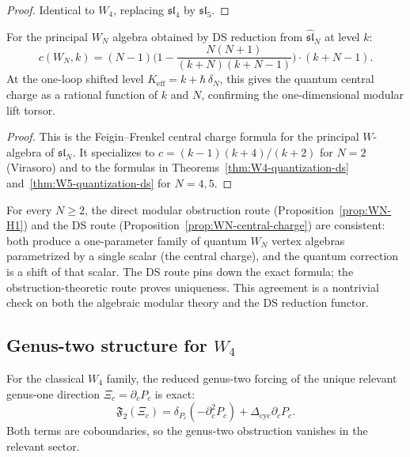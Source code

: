 \begin{proof}
Identical to $W_4$, replacing $\mathfrak{sl}_4$ by $\mathfrak{sl}_5$.
\end{proof}

\begin{proposition}
For the principal $W_N$ algebra obtained by DS reduction from
$\widehat{\mathfrak{sl}}_N$ at level $k$:
\begin{equation}%
c(W_N, k)
=
(N-1)\biggl(1 - \frac{N(N+1)}{(k+N)(k+N-1)}\biggr)
\cdot (k+N-1).
\end{equation}
At the one-loop shifted level $K_{\mathrm{eff}} = k + \hbar\,\delta_N$,
this gives the quantum central charge as a rational function of $k$
and $N$, confirming the one-dimensional modular lift torsor.
\end{proposition}

\begin{proof}
This is the Feigin--Frenkel central charge formula for the principal
$W$-algebra of $\mathfrak{sl}_N$. It specializes to $c = (k-1)(k+4)/(k+2)$
for $N=2$ (Virasoro) and to the formulas in
Theorems~\ref{thm:W4-quantization-ds} and~\ref{thm:W5-quantization-ds}
for $N=4,5$.
\end{proof}

\begin{remark}
For every $N \ge 2$, the direct modular obstruction route
(Proposition~\ref{prop:WN-H1}) and the DS route
(Proposition~\ref{prop:WN-central-charge}) are consistent:
both produce a one-parameter family of quantum $W_N$ vertex algebras
parametrized by a single scalar (the central charge), and the quantum
correction is a shift of that scalar. The DS route pins down the
exact formula; the obstruction-theoretic route proves uniqueness.
This agreement is a nontrivial check on both the algebraic modular
theory and the DS reduction functor.
\end{remark}

\subsection{Genus-two structure for $W_4$}

\begin{proposition}
For the classical $W_4$ family, the reduced genus-two forcing of the
unique relevant genus-one direction $\Xi_c = \partial_c P_c$ is exact:
\[
\mathfrak{F}_2(\Xi_c)
=
\delta_{P_c}(-\partial_c^2 P_c) + \Delta_{\mathrm{cyc}}\partial_c P_c.
\]
Both terms are coboundaries, so the genus-two obstruction vanishes
in the relevant sector.
\end{proposition}

